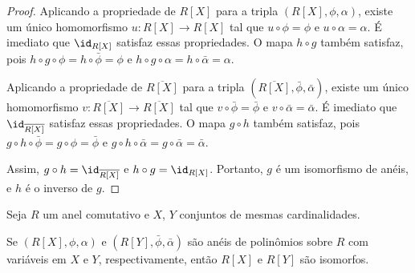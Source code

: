 \begin{proof}
    Aplicando a propriedade de $R[X]$ para a tripla $(R[X], \phi, \alpha)$, existe um único homomorfismo $u:R[X]\rightarrow R[X]$ tal que $u\circ \phi=\phi$ e $u\circ \alpha=\alpha$.
    É imediato que $\id_{R[X]}$ satisfaz essas propriedades. O mapa $h\circ g$ também satisfaz, pois $h\circ g\circ \phi=h\circ \bar \phi=\phi$ e $h\circ g\circ \alpha=h\circ \bar \alpha=\alpha$.
    \begin{figure}[H]
        \centering
    \end{figure}    
    Aplicando a propriedade de $\overline{R[X]}$ para a tripla $(\overline{R[X]}, \bar \phi, \bar \alpha)$, existe um único homomorfismo $v:\overline{R[X]}\rightarrow \overline{R[X]}$ tal que $v\circ \bar \phi=\bar \phi$ e $v\circ \bar \alpha=\bar \alpha$.
    É imediato que $\id_{\overline{R[X]}}$ satisfaz essas propriedades. O mapa $g\circ h$ também satisfaz, pois $g\circ h\circ \bar \phi=g\circ \phi=\bar \phi$ e $g\circ h\circ \bar \alpha=g\circ \bar \alpha=\bar \alpha$.

    \begin{figure}[H]
        \centering
    \end{figure}    

    Assim, $g\circ h=\id_{\overline{R[X]}}$ e $h\circ g=\id_{R[X]}$. Portanto, $g$ é um isomorfismo de anéis, e $h$ é o inverso de $g$.
\end{proof}

\begin{corol}
    Seja $R$ um anel comutativo e $X$, $Y$ conjuntos de mesmas cardinalidades.

    Se $(R[X], \phi, \alpha)$ e $(R[Y], \bar \phi, \bar \alpha)$ são anéis de polinômios sobre $R$ com variáveis em $X$ e $Y$, respectivamente, então $R[X]$ e $R[Y]$ são isomorfos.
\end{corol}


